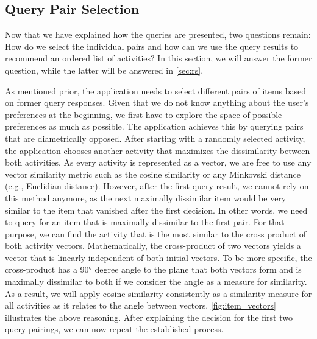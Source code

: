 \documentclass[11pt,a4paper,oneside]{article}
\begin{document}
\subsection{Query Pair Selection}
\label{sec:pair}
Now that we have explained how the queries are presented, two questions remain: How do we select the individual pairs and how can we use the query results to recommend an ordered list of activities? In this section, we will answer the former question, while the latter will be answered in \autoref{sec:rs}. 

As mentioned prior, the application needs to select different pairs of items based on former query responses. Given that we do not know anything about the user's preferences at the beginning, we first have to explore the space of possible preferences as much as possible. The application achieves this by querying pairs that are diametrically opposed. After starting with a randomly selected activity, the application chooses another activity that maximizes the dissimilarity between both activities. As every activity is represented as a vector, we are free to use any vector similarity metric such as the cosine similarity or any Minkovski distance (e.g., Euclidian distance). However, after the first query result, we cannot rely on this method anymore, as the next maximally dissimilar item would be very similar to the item that vanished after the first decision. In other words, we need to query for an item that is maximally dissimilar to the first pair. For that purpose, we can find the activity that is the most similar to the cross product of both activity vectors. Mathematically, the cross-product of two vectors yields a vector that is linearly independent of both initial vectors. To be more specific, the cross-product has a 90° degree angle to the plane that both vectors form and is maximally dissimilar to both if we consider the angle as a measure for similarity. As a result, we will apply cosine similarity consistently as a similarity measure for all activities as it relates to the angle between vectors. \autoref{fig:item_vectors} illustrates the above reasoning. After explaining the decision for the first two query pairings, we can now repeat the established process. 
\end{document}
